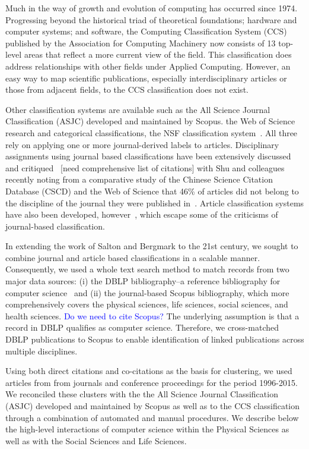 Much in the way of growth and evolution of computing has occurred since 1974. Progressing beyond the historical triad of theoretical foundations; hardware and computer systems; and software, the Computing Classification System (CCS)~\cite{acm_ref} published by the Association for Computing Machinery now consists of 13 top-level areas that reflect a more current view of the field. This classification does address relationships with other fields under Applied Computing. However, an easy way to map scientific publications, especially interdisciplinary articles or those from adjacent fields, to the CCS classification does not exist. 

Other classification systems are available such as the All Science Journal Classification (ASJC) developed and maintained by Scopus. the Web of Science research and categorical classifications, the NSF classification system~\cite{nsf_classification}. All three rely on applying one or more journal-derived labels to articles. Disciplinary assignments using journal based classifications have been extensively discussed and critiqued~\cite{wang_large-scale_2016} [need comprehensive list of citations] with Shu and colleagues recently noting from a comparative study of the Chinese Science Citation Database (CSCD) and the Web of Science that 46\% of articles did not belong to the discipline of the journal they were published in~\cite{shu_comparing_2019}. Article classification systems have also been developed, however~\cite{traag_louvain_2019,boyack_classification_2014,waltman_new_2012}, which escape some of the criticisms of journal-based classification.

In extending the work of Salton and Bergmark to the 21st century, we sought to combine journal and article based classifications in a scalable manner. Consequently, we used a whole text search method to match records from two major data sources: (i) the DBLP bibliography--a reference bibliography for computer science~\cite{dblp_ref} and  (ii) the journal-based Scopus bibliography, which more comprehensively covers the physical sciences, life sciences, social sciences, and health sciences. 
\textcolor{blue}{Do we need to cite Scopus?}
The underlying assumption is that a record in DBLP qualifies as computer science. Therefore, we cross-matched DBLP publications to Scopus to  enable identification of linked publications across multiple disciplines.

Using both direct citations and co-citations as the basis for clustering, we used articles from from journals and conference proceedings for the period 1996-2015. We reconciled these clusters with the the All Science Journal Classification (ASJC) developed and maintained by Scopus as well as to the CCS classification through a combination of automated and manual procedures. We describe below the high-level interactions of computer science within the Physical Sciences as well as with the Social Sciences and Life Sciences. 

